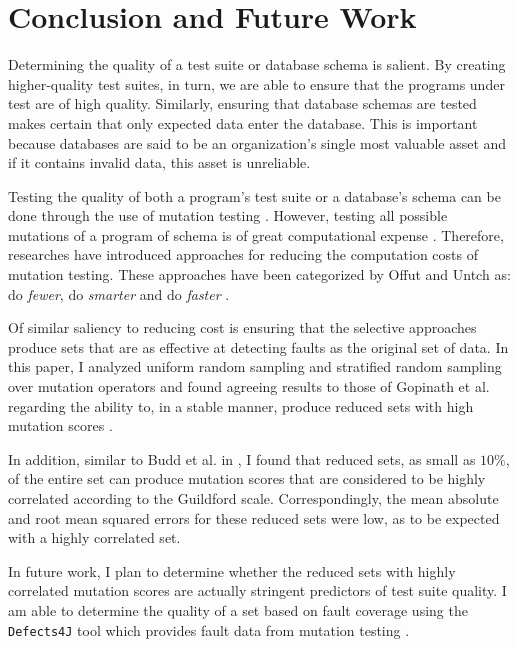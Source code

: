 \documentclass[conference]{IEEEtran}
\begin{document}
\section{Conclusion and Future Work}

Determining the quality of a test suite or database schema is salient.
By creating higher-quality test suites, in turn, we are able to ensure that the programs
under test are of high quality. Similarly, ensuring that database schemas are tested makes certain
that only expected data enter the database. This is important because databases are said to be an organization's single most
valuable asset \cite{silberschatz1997database} and if it contains invalid data, this asset is unreliable.

Testing the quality of both a program's test suite or a database's schema can be done
through the use of mutation testing \cite{gopinath2015empirical, mcminn2015effectiveness}. However,
testing all possible mutations of a program of schema is of great computational expense \cite{offutt1993experimental}.
Therefore, researches have introduced approaches for reducing the computation costs
of mutation testing. These approaches have been categorized by
Offut and Untch as: do \textit{fewer}, do \textit{smarter} and do \textit{faster} \cite{offutt1993experimental}.

Of similar saliency to reducing cost is ensuring that the selective approaches
produce sets that are as effective at detecting faults as the original
set of data. In this paper, I analyzed uniform random sampling and stratified random sampling
over mutation operators and found agreeing results to those of Gopinath et al. regarding the
ability to, in a stable manner, produce reduced sets with high mutation scores \cite{gopinath2015empirical}.

In addition, similar to Budd et al. in \cite{budd1980mutation}, I found that reduced sets, as small as $10\%$,
of the entire set can produce mutation scores that are considered to be highly correlated according
to the Guildford scale. Correspondingly, the mean absolute and root mean squared errors for these
reduced sets were low, as to be expected with a highly correlated set.

In future work, I plan to determine whether the reduced sets with highly correlated mutation scores
are actually stringent predictors of test suite quality. I am able to determine the quality of
a set based on fault coverage using the \texttt{Defects4J} tool which provides fault data from mutation
testing \cite{just2014defects4j}.
\end{document}
